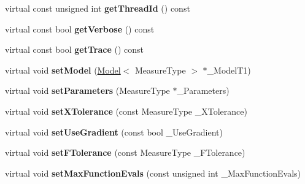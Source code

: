 \begin{DoxyCompactItemize}
\item 
\hypertarget{class_ox_1_1_fitter_a68e317f1c05ea2aa24f9d4803ee19215}{virtual const unsigned int {\bfseries get\-Thread\-Id} () const }\label{class_ox_1_1_fitter_a68e317f1c05ea2aa24f9d4803ee19215}

\item 
\hypertarget{class_ox_1_1_fitter_afeba16a2218db1f3fc646e2dde75f386}{virtual const bool {\bfseries get\-Verbose} () const }\label{class_ox_1_1_fitter_afeba16a2218db1f3fc646e2dde75f386}

\item 
\hypertarget{class_ox_1_1_fitter_a9c3401372be5c8698464deb05c0f5533}{virtual const bool {\bfseries get\-Trace} () const }\label{class_ox_1_1_fitter_a9c3401372be5c8698464deb05c0f5533}

\item 
\hypertarget{class_ox_1_1_fitter_a58bc5939283a694d4683dcc160ad4009}{virtual void {\bfseries set\-Model} (\hyperlink{class_ox_1_1_model}{Model}$<$ Measure\-Type $>$ $\ast$\-\_\-\-Model\-T1)}\label{class_ox_1_1_fitter_a58bc5939283a694d4683dcc160ad4009}

\item 
\hypertarget{class_ox_1_1_fitter_ab97f65c7d4d4db9bb0f5934aa0601b73}{virtual void {\bfseries set\-Parameters} (Measure\-Type $\ast$\-\_\-\-Parameters)}\label{class_ox_1_1_fitter_ab97f65c7d4d4db9bb0f5934aa0601b73}

\item 
\hypertarget{class_ox_1_1_fitter_ad2b680ee88b12dd51538a2da865b2589}{virtual void {\bfseries set\-X\-Tolerance} (const Measure\-Type \-\_\-\-X\-Tolerance)}\label{class_ox_1_1_fitter_ad2b680ee88b12dd51538a2da865b2589}

\item 
\hypertarget{class_ox_1_1_fitter_a2441247888adc90a26d779043f10c5e1}{virtual void {\bfseries set\-Use\-Gradient} (const bool \-\_\-\-Use\-Gradient)}\label{class_ox_1_1_fitter_a2441247888adc90a26d779043f10c5e1}

\item 
\hypertarget{class_ox_1_1_fitter_aca7109a663e737c46cb29483c2276f4a}{virtual void {\bfseries set\-F\-Tolerance} (const Measure\-Type \-\_\-\-F\-Tolerance)}\label{class_ox_1_1_fitter_aca7109a663e737c46cb29483c2276f4a}

\item 
\hypertarget{class_ox_1_1_fitter_a293d2876b8b053bd637c35c3f6f3f68e}{virtual void {\bfseries set\-Max\-Function\-Evals} (const unsigned int \-\_\-\-Max\-Function\-Evals)}\label{class_ox_1_1_fitter_a293d2876b8b053bd637c35c3f6f3f68e}


\end{DoxyCompactItemize}
